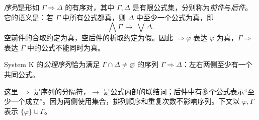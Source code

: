 \documentclass[lang=cn,a4paper,fontset=none,zihao=false,10pt,openany,twoside]{beautybook}
\numberwithin{algorithm}{chapter}
\begin{document}
\begin{definition}[序列与公理]
\emph{序列}是形如 $\Gamma\Rightarrow\Delta$ 的有序对，其中 $\Gamma,\Delta$ 是有限公式集，分别称为\emph{前件}与\emph{后件}。它的语义是：若 $\Gamma$ 中所有公式都真，则 $\Delta$ 中至少一个公式为真，即
\[
 \bigwedge\Gamma\ \to\ \bigvee\Delta.
\]
空前件的合取约定为真，空后件的析取约定为假。因此 $\Rightarrow\varphi$ 表达 $\varphi$ 为真，$\Gamma\Rightarrow$ 表达 $\Gamma$ 中的公式不能同时为真。

System K 的\emph{公理序列}恰为满足 $\Gamma\cap\Delta\neq\varnothing$ 的序列 $\Gamma\Rightarrow\Delta$：左右两侧至少有一个共同公式。
\end{definition}
这里 $\Rightarrow$ 是序列的分隔符，$\to$ 是公式内部的联结词；后件中有多个公式表示“至少一个成立”。因为两侧使用集合，排列顺序和重复次数不影响序列。下文以 $\varphi,\Gamma$ 表示 $\{\varphi\}\cup\Gamma$。
\end{document}

